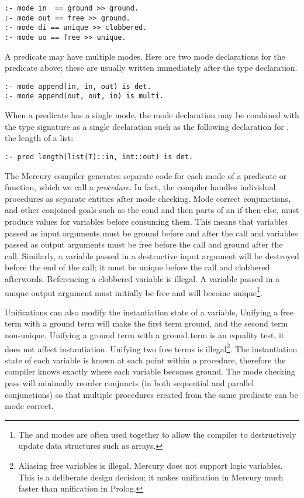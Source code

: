 \begin{verbatim}
:- mode in  == ground >> ground.
:- mode out == free >> ground.
:- mode di == unique >> clobbered.
:- mode uo == free >> unique.
\end{verbatim}

\noindent
A predicate may have multiple modes.
Here are two mode declarations for the  predicate above;
these are usually written immediately after the type declaration.

\begin{verbatim}
:- mode append(in, in, out) is det.
:- mode append(out, out, in) is multi.
\end{verbatim}

\noindent
When a predicate has a single mode,
the mode declaration may be combined with the type signature as a single
declaration such as the following declaration for ,
the length of a list:

\begin{verbatim}
:- pred length(list(T)::in, int::out) is det.
\end{verbatim}

\noindent
The Mercury compiler generates separate code
for each mode of a predicate or function,
which we call a \emph{procedure}.
In fact, the compiler handles individual procedures as separate entities
after mode checking.
Mode correct conjunctions,
and other conjoined goals such as the cond and then parts of an if-then-else,
must produce values for variables before consuming them.
This means that
variables passed as input arguments must be ground before and after the
call and
variables passed as output arguments must be free before the call and
ground after the call.
Similarly, a variable passed in a destructive input argument will be destroyed
before the end of the call;
it must be unique before the call and clobbered afterwords.
Referencing a clobbered variable is illegal.
A variable passed in a unique output argument must initially be free and
will become unique\footnote{
    The \di and \uo modes are often used together to allow the compiler to
    destructively update data structures such as arrays.}.

Unifications can also modify the instantiation state of a variable,
Unifying a free term with a ground term will make the first term ground,
and the second term non-unique.
Unifying a ground term with a ground term is an equality test,
it does not affect instantiation.
Unifying two free terms is illegal\footnote{
Aliasing free variables is illegal,
Mercury does not support logic variables.
This is a deliberate design decision;
it makes unification in Mercury much
faster than unification in Prolog.}.
The instantiation state of each variable is known at each point
within a procedure,
therefore
the compiler knows exactly where each variable becomes ground.
The mode checking pass will minimally reorder conjuncts 
(in both sequential and parallel conjunctions)
so that multiple procedures created from the same predicate can be mode
correct.

